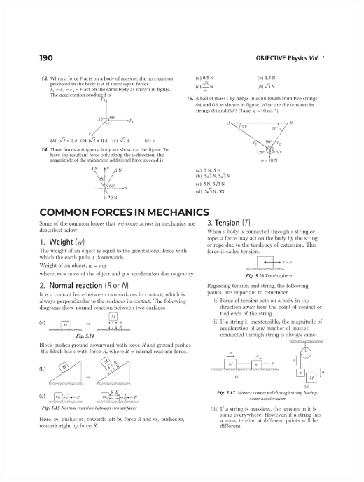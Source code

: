 \documentclass{article}
\begin{document}
\includegraphics[trim={1cm 0 0 0},clip, width=170 mm]{problem-13-15}
\linebreak
\end{document}
